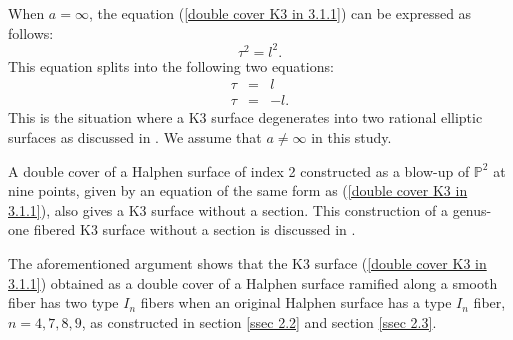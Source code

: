 \documentclass[12pt]{article}
\def\P{\mathbb{P}}
\begin{document}
\par When $a=\infty$, the equation (\ref{double cover K3 in 3.1.1}) can be expressed as follows:
\begin{equation}
\tau^2 = l^2.
\end{equation}
This equation splits into the following two equations:
\begin{eqnarray}
\tau & = & l \\ \nonumber
\tau & = & -l.
\end{eqnarray}
This is the situation where a K3 surface degenerates into two rational elliptic surfaces as discussed in \cite{Kimura1710}. We assume that $a\ne\infty$ in this study.
\par A double cover of a Halphen surface of index 2 constructed as a blow-up of $\P^2$ at nine points, given by an equation of the same form as (\ref{double cover K3 in 3.1.1}), also gives a K3 surface without a section. This construction of a genus-one fibered K3 surface without a section is discussed in \cite{Kimura1801}.
\par The aforementioned argument shows that the K3 surface (\ref{double cover K3 in 3.1.1}) obtained as a double cover of a Halphen surface ramified along a smooth fiber has two type $I_n$ fibers when an original Halphen surface has a type $I_n$ fiber, $n=4,7,8,9$, as constructed in section \ref{ssec 2.2} and section \ref{ssec 2.3}. 
\end{document}
